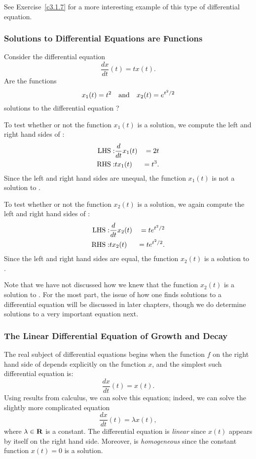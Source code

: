 See Exercise~\ref{c3.1.7} for a more interesting example of this type of
differential equation.

\subsubsection*{Solutions to Differential Equations are Functions}

Consider the differential equation 
\begin{equation} \label{E:verify}
\frac{dx}{dt}(t) = tx(t).
\end{equation}
Are the functions
\[
x_1(t) = t^2 \quad\mbox{and}\quad x_2(t) = e^{t^2/2}
\]
solutions to the differential equation ?

To test whether or not the function $x_1(t)$ is a solution, we compute
the left and right hand sides of :
\begin{eqnarray*}
{\rm LHS:} & \frac{d}{dt}x_1(t) & = 2t\\
{\rm RHS:} &  tx_1(t) & = t^3.
\end{eqnarray*}
Since the left and right hand sides are unequal, the function $x_1(t)$
is not a solution to .

To test whether or not the function $x_2(t)$ is a solution, we again
compute the left and right hand sides of :
\begin{eqnarray*}
{\rm LHS:} & \frac{d}{dt}x_2(t) & = te^{t^2/2}\\
{\rm RHS:} &  tx_2(t) & = te^{t^2/2}.
\end{eqnarray*}
Since the left and right hand sides are equal, the function $x_2(t)$
is a solution to .

Note that we have not discussed how we knew that the function $x_2(t)$
is a solution to .  For the most part, the issue of how
one finds solutions to a differential equation will be discussed in later
chapters, though we do determine solutions to a very important equation next.

\subsubsection*{The Linear Differential Equation of Growth and Decay}

The real subject of differential equations begins when the function $f$
on the right hand side of  depends explicitly on the
function $x$, and the simplest such differential equation is:
\[
\frac{dx}{dt}(t) = x(t).
\]
Using results from calculus, we can solve this equation; indeed,
we can solve the slightly more complicated equation
\begin{equation}  \label{lin1}
\frac{dx}{dt}(t) = \lambda x(t),
\end{equation}
where $\lambda\in\mbox{$\bf{R}$}$ is a constant.  The differential equation  is 
{\em linear\/} since $x(t)$ appears by itself on the right hand side.  
Moreover,  is {\em homogeneous\/} since the constant function 
$x(t)=0$ is a solution.


